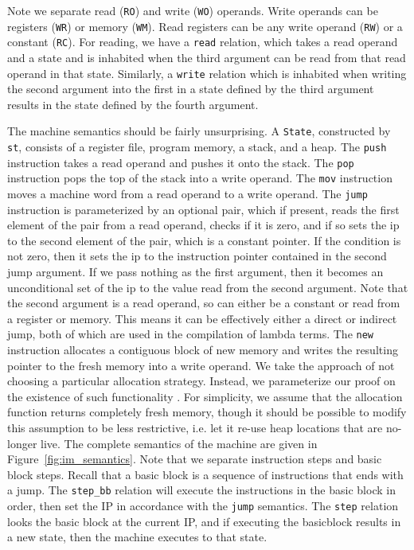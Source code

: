 Note we separate read (\texttt{RO}) and write (\texttt{WO}) operands. Write
operands can be registers (\texttt{WR}) or memory (\texttt{WM}). Read registers
can be any write operand (\texttt{RW}) or a constant (\texttt{RC}). For reading,
we have a \texttt{read} relation, which takes a read operand and a state and is
inhabited when the third argument can be read from that read operand in that
state. Similarly, a \texttt{write} relation which is inhabited when writing the
second argument into the first in a state defined by the third argument results
in the state defined by the fourth argument.  

The machine semantics should be fairly unsurprising. A \texttt{State},
constructed by \texttt{st}, consists of a register file, program memory, a
stack, and a heap. The \texttt{push} instruction takes a read operand and pushes
it onto the stack. The \texttt{pop} instruction pops the top of the stack into a
write operand. The \texttt{mov} instruction moves a machine word from a read
operand to a write operand. The \texttt{jump} instruction is parameterized by an
optional pair, which if present, reads the first element of the pair from a read
operand, checks if it is zero, and if so sets the ip to the second element of
the pair, which is a constant pointer. If the condition is not zero, then it
sets the ip to the instruction pointer contained in the second jump argument. If
we pass nothing as the first argument, then it becomes an unconditional set of
the ip to the value read from the second argument.  Note that the second
argument is a read operand, so can either be a constant or read from a register
or memory. This means it can be effectively either a direct or indirect jump,
both of which are used in the compilation of lambda terms. The \texttt{new}
instruction allocates a contiguous block of new memory and writes the resulting
pointer to the fresh memory into a write operand. We take the approach of not
choosing a particular allocation strategy. Instead, we parameterize our proof on
the existence of such functionality \cite{chlipala}. For simplicity, we assume
that the allocation function returns completely fresh memory, though it should
be possible to modify this assumption to be less restrictive, i.e. let it re-use
heap locations that are no-longer live. The complete semantics of the machine
are given in Figure~\ref{fig:im_semantics}. Note that we separate instruction
steps and basic block steps. Recall that a basic block is a sequence of
instructions that ends with a jump. The \texttt{step\_bb} relation will execute
the instructions in the basic block in order, then set the IP in accordance with
the \texttt{jump} semantics. The \texttt{step} relation looks the basic block at
the current IP, and if executing the basicblock results in a new state, then the
machine executes to that state. 

